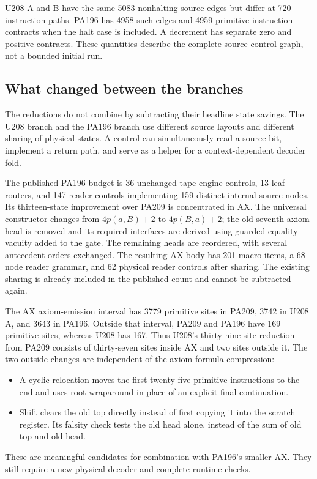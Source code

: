 U208 A and B have the same 5083 nonhalting source edges but differ at 720 instruction paths. PA196 has 4958 such edges and 4959 primitive instruction contracts when the halt case is included. A decrement has separate zero and positive contracts. These quantities describe the complete source control graph, not a bounded initial run.

\subsection{What changed between the branches}
The reductions do not combine by subtracting their headline state savings. The U208 branch and the PA196 branch use different source layouts and different sharing of physical states. A control can simultaneously read a source bit, implement a return path, and serve as a helper for a context-dependent decoder fold.

The published PA196 budget is 36 unchanged tape-engine controls, 13 leaf routers, and 147 reader controls implementing 159 distinct internal source nodes\cite{pa196}. Its thirteen-state improvement over PA209 is concentrated in AX. The universal constructor changes from $4p(a,B)+2$ to $4p(B,a)+2$; the old seventh axiom head is removed and its required interfaces are derived using guarded equality vacuity added to the gate. The remaining heads are reordered, with several antecedent orders exchanged. The resulting AX body has 201 macro items, a 68-node reader grammar, and 62 physical reader controls after sharing. The existing sharing is already included in the published count and cannot be subtracted again.

The AX axiom-emission interval has 3779 primitive sites in PA209, 3742 in U208 A, and 3643 in PA196. Outside that interval, PA209 and PA196 have 169 primitive sites, whereas U208 has 167. Thus U208's thirty-nine-site reduction from PA209 consists of thirty-seven sites inside AX and two sites outside it. The two outside changes are independent of the axiom formula compression:
\begin{itemize}
\item A cyclic relocation moves the first twenty-five primitive instructions to the end and uses root wraparound in place of an explicit final continuation.
\item Shift clears the old top directly instead of first copying it into the scratch register. Its falsity check tests the old head alone, instead of the sum of old top and old head.
\end{itemize}
These are meaningful candidates for combination with PA196's smaller AX. They still require a new physical decoder and complete runtime checks.

